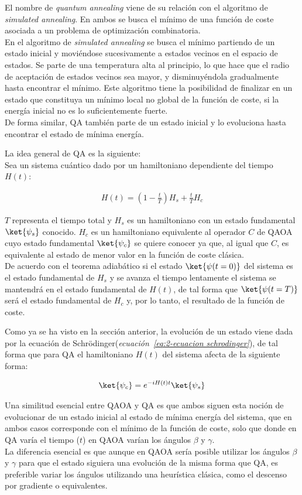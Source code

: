 El nombre de \textit{quantum annealing} viene de su relación con el algoritmo de \textit{simulated annealing}.
En ambos se busca el mínimo de una función de coste asociada a un problema de optimización combinatoria.
\\
En el algoritmo de \textit{simulated annealing} se busca el mínimo partiendo de un estado inicial y moviéndose sucesivamente a estados vecinos en el espacio de estados.
Se parte de una temperatura alta al principio, lo que hace que el radio de aceptación de estados vecinos sea mayor, y disminuyéndola gradualmente hasta encontrar el mínimo.
Este algoritmo tiene la posibilidad de finalizar en un estado que constituya un mínimo local no global de la función de coste, si la energía inicial no es lo suficientemente fuerte.
\\
De forma similar, QA también parte de un estado inicial y lo evoluciona hasta encontrar el estado de mínima energía.

La idea general de QA es la siguiente:
\\
Sea un sistema cuántico dado por un hamiltoniano dependiente del tiempo $H(t)$:

\begin{align}
  H(t) = (1-\frac{t}{T})H_s + \frac{t}{T}H_c
\end{align}

$T$ representa el tiempo total y $H_s$ es un hamiltoniano con un estado fundamental $\ket{\psi_s}$ conocido.
$H_c$ es un hamiltoniano equivalente al operador $C$ de QAOA cuyo estado fundamental $\ket{\psi_c}$ se quiere conocer ya que, al igual que $C$, es equivalente al estado de menor valor en la función de coste clásica.
\\
De acuerdo con el teorema adiabático\cite{adiabatic_theorem} si el estado $\ket{\psi(t=0)}$ del sistema es el estado fundamental de $H_s$ y se avanza el tiempo lentamente el sistema se mantendrá en el estado fundamental de $H(t)$, de tal forma que $\ket{\psi(t=T)}$ será el estado fundamental de $H_c$ y, por lo tanto, el resultado de la función de coste.

Como ya se ha visto en la sección anterior, la evolución de un estado viene dada por la ecuación de Schrödinger(\textit{ecuación~\ref{eq:2-ecuacion schrodinger}}), de tal forma que para QA el hamiltoniano $H(t)$ del sistema afecta de la siguiente forma:

\begin{align}
  \ket{\psi_c} = e^{-i H(t) t}\ket{\psi_s}
\end{align}

Una similitud esencial entre QAOA y QA es que ambos siguen esta noción de evolucionar de un estado inicial al estado de mínima energía del sistema, que en ambos casos corresponde con el mínimo de la función de coste, solo que donde en QA varía el tiempo ($t$) en QAOA varían los ángulos $\beta$ y $\gamma$.
\\
La diferencia esencial es que aunque en QAOA sería posible utilizar los ángulos $\beta$ y $\gamma$ para que el estado siguiera una evolución de la misma forma que QA, es preferible variar los ángulos utilizando una heurística clásica, como el descenso por gradiente o equivalentes.


